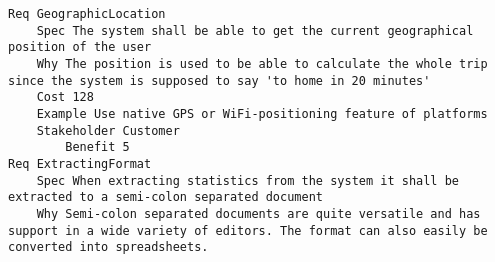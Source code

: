 

\begin{lstlisting}
Req GeographicLocation
	Spec The system shall be able to get the current geographical position of the user
	Why The position is used to be able to calculate the whole trip since the system is supposed to say 'to home in 20 minutes' 
	Cost 128
	Example Use native GPS or WiFi-positioning feature of platforms
	Stakeholder Customer
		Benefit 5
Req ExtractingFormat
	Spec When extracting statistics from the system it shall be extracted to a semi-colon separated document
	Why Semi-colon separated documents are quite versatile and has support in a wide variety of editors. The format can also easily be converted into spreadsheets.

\end{lstlisting}